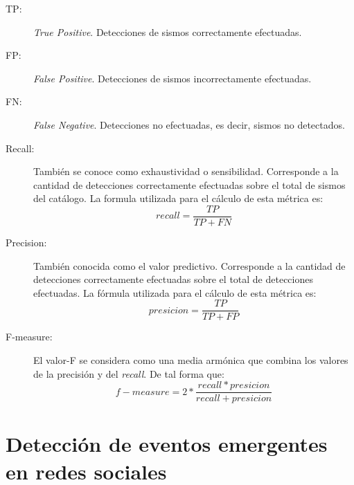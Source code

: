 \begin{description}

\item[TP:] \textit{True Positive}. Detecciones de sismos correctamente efectuadas.

\item[FP:] \textit{False Positive}. Detecciones de sismos incorrectamente efectuadas.

\item[FN:] \textit{False Negative}. Detecciones no efectuadas, es decir, sismos no detectados. 

\item[Recall:] También se conoce como exhaustividad o sensibilidad. Corresponde a la cantidad de detecciones correctamente efectuadas sobre el total de sismos del catálogo. La formula utilizada para el cálculo de esta métrica es:  
\[recall = \frac{TP}{TP + FN}\]

\item[Precision:] También conocida como el valor predictivo. Corresponde a la cantidad de detecciones correctamente efectuadas sobre el total de detecciones efectuadas. La fórmula utilizada para el cálculo de esta métrica es: 
\[presicion = \frac{TP}{TP + FP}\]

\item[F-measure:] El valor-F se considera como una media armónica que combina los valores de la precisión y del \textit{recall}. De tal forma que: 
\[f-measure = 2*\frac{recall * presicion}{recall + presicion}\]
\end{description}


\section{Detección de eventos emergentes en redes sociales}
\label{sec:deteccioneventos}

